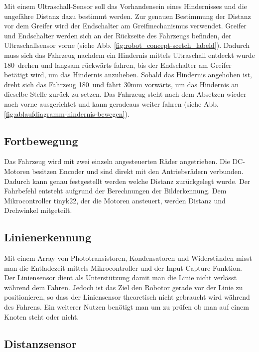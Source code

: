  Mit einem Ultraschall-Sensor soll das Vorhandensein eines Hindernisses und die ungefähre Distanz dazu bestimmt werden. Zur genauen Bestimmung der Distanz vor dem Greifer wird der Endschalter am Greifmechanismus verwendet.
Greifer und Endschalter werden sich an der Rückseite des Fahrzeugs befinden, der Ultraschallsensor vorne (siehe Abb. \ref{fig:robot_concept-scetch_labeld}). Dadurch muss sich das Fahrzeug nachdem ein Hindernis mittels Ultraschall entdeckt wurde 180\textdegree\ drehen und langsam rückwärts fahren, bis der Endschalter am Greifer betätigt wird, um das Hindernis anzuheben. Sobald das Hindernis angehoben ist, dreht sich das Fahrzeug 180\textdegree\ und fährt 30mm vorwärts, um das Hindernis an dieselbe Stelle zurück zu setzen. Das Fahrzeug steht nach dem Absetzen wieder nach vorne ausgerichtet und kann geradeaus weiter fahren (siehe  Abb. \ref{fig:ablaufdiagramm-hindernis-bewegen}).


\subsection{Fortbewegung}

Das Fahrzeug wird mit zwei einzeln angesteuerten Räder angetrieben. Die DC-Motoren besitzen Encoder und sind direkt mit den Antriebsrädern verbunden.  Dadurch kann genau festgestellt werden welche Distanz zurückgelegt wurde. Der Fahrbefehl entsteht aufgrund der Berechnungen der Bilderkennung. Dem Mikrocontroller \acrshort{tinyk22}, der die Motoren ansteuert,  werden Distanz und Drehwinkel mitgeteilt.

\subsection{Linienerkennung}

Mit einem Array von Phototransistoren,  Kondensatoren und Widerständen misst man die Entladezeit mittels Mikrocontroller und der Input Capture Funktion. Der Liniensensor dient als Unterstützung damit man die Linie nicht verlässt während dem Fahren. Jedoch ist das Ziel den Robotor gerade vor der Linie zu positionieren, so dass der Liniensensor theoretisch nicht gebraucht wird während des Fahrens. Ein weiterer Nutzen benötigt man um zu prüfen ob man auf einem Knoten steht oder nicht.

\subsection{Distanzsensor}

